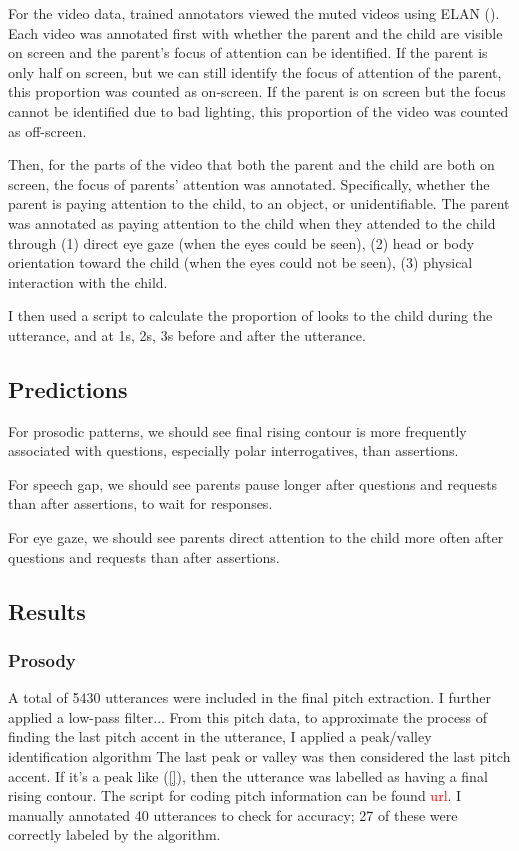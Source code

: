 For the video data, trained annotators viewed the muted videos using ELAN (\cite{elan}). Each video was annotated first with whether the parent and the child are visible on screen and the parent's focus of attention can be identified. If the parent is only half on screen, but we can still identify the focus of attention of the parent, this proportion was counted as on-screen. If the parent is on screen but the focus cannot be identified due to bad lighting, this proportion of the video was counted as off-screen.

Then, for the parts of the video that both the parent and the child are both on screen, the focus of parents' attention was annotated. Specifically, whether the parent is paying attention to the child, to an object, or unidentifiable. The parent was annotated as paying attention to the child when they attended to the child through (1) direct eye gaze (when the eyes could be seen), (2) head or body orientation toward the child (when the eyes could not be seen), (3) physical interaction with the child.  

I then used a script to calculate the proportion of looks to the child during the utterance, and at 1s, 2s, 3s before and after the utterance.%

\subsection{Predictions}
\label{sec:engsp:predictions}
For prosodic patterns, we should see final rising contour is more frequently associated with questions, especially polar interrogatives, than assertions.

For speech gap, we should see parents pause longer after questions and requests than after assertions, to wait for responses.

For eye gaze, we should see parents direct attention to the child more often after questions and requests than after assertions. 


\subsection{Results}
\label{sec:engsp:results}

\subsubsection{Prosody}
\label{sec:engsp:results:prosody}
A total of 5430 utterances were included in the final pitch extraction. I further applied a low-pass filter...%
From this pitch data, to approximate the process of finding the last pitch accent in the utterance, I applied a peak/valley identification algorithm %
The last peak or valley was then considered the last pitch accent. If it's a peak like (\ref{}), then the utterance was labelled as having a final rising contour. The script for coding pitch information can be found \textcolor{red}{url}. I manually annotated 40 utterances to check for accuracy; 27 of these were correctly labeled by the algorithm.   %





